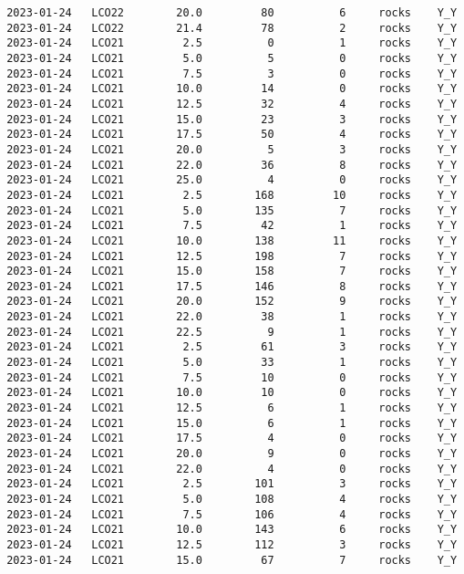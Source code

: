 \documentclass[
]{article}
\begin{document}
\begin{verbatim}
 2023-01-24   LCO22        20.0         80          6     rocks    Y_Y
 2023-01-24   LCO22        21.4         78          2     rocks    Y_Y
 2023-01-24   LCO21         2.5          0          1     rocks    Y_Y
 2023-01-24   LCO21         5.0          5          0     rocks    Y_Y
 2023-01-24   LCO21         7.5          3          0     rocks    Y_Y
 2023-01-24   LCO21        10.0         14          0     rocks    Y_Y
 2023-01-24   LCO21        12.5         32          4     rocks    Y_Y
 2023-01-24   LCO21        15.0         23          3     rocks    Y_Y
 2023-01-24   LCO21        17.5         50          4     rocks    Y_Y
 2023-01-24   LCO21        20.0          5          3     rocks    Y_Y
 2023-01-24   LCO21        22.0         36          8     rocks    Y_Y
 2023-01-24   LCO21        25.0          4          0     rocks    Y_Y
 2023-01-24   LCO21         2.5        168         10     rocks    Y_Y
 2023-01-24   LCO21         5.0        135          7     rocks    Y_Y
 2023-01-24   LCO21         7.5         42          1     rocks    Y_Y
 2023-01-24   LCO21        10.0        138         11     rocks    Y_Y
 2023-01-24   LCO21        12.5        198          7     rocks    Y_Y
 2023-01-24   LCO21        15.0        158          7     rocks    Y_Y
 2023-01-24   LCO21        17.5        146          8     rocks    Y_Y
 2023-01-24   LCO21        20.0        152          9     rocks    Y_Y
 2023-01-24   LCO21        22.0         38          1     rocks    Y_Y
 2023-01-24   LCO21        22.5          9          1     rocks    Y_Y
 2023-01-24   LCO21         2.5         61          3     rocks    Y_Y
 2023-01-24   LCO21         5.0         33          1     rocks    Y_Y
 2023-01-24   LCO21         7.5         10          0     rocks    Y_Y
 2023-01-24   LCO21        10.0         10          0     rocks    Y_Y
 2023-01-24   LCO21        12.5          6          1     rocks    Y_Y
 2023-01-24   LCO21        15.0          6          1     rocks    Y_Y
 2023-01-24   LCO21        17.5          4          0     rocks    Y_Y
 2023-01-24   LCO21        20.0          9          0     rocks    Y_Y
 2023-01-24   LCO21        22.0          4          0     rocks    Y_Y
 2023-01-24   LCO21         2.5        101          3     rocks    Y_Y
 2023-01-24   LCO21         5.0        108          4     rocks    Y_Y
 2023-01-24   LCO21         7.5        106          4     rocks    Y_Y
 2023-01-24   LCO21        10.0        143          6     rocks    Y_Y
 2023-01-24   LCO21        12.5        112          3     rocks    Y_Y
 2023-01-24   LCO21        15.0         67          7     rocks    Y_Y

\end{verbatim}
\end{document}
